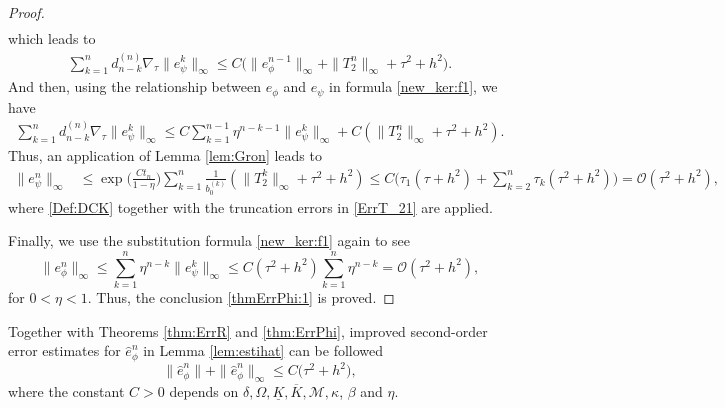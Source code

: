 \documentclass{m2an}
\newcommand{\mo}{\mathcal{O}}
\begin{document}
\begin{proof}
\begin{equation*}
\begin{aligned}
		\end{aligned}
	\end{equation*}
	which leads to
	\begin{equation*}
		\begin{aligned}
			\sum^n_{k=1} d_{n-k}^{(n)} \nabla_{\tau} \| e_{\psi}^k \|_{\infty} \leq C \big( \| e_\phi^{n-1} \|_{\infty} + \| T_2^n \|_{\infty} + \tau^2 + h^2 \big).
		\end{aligned}
	\end{equation*}
	And then, using the relationship between $e_\phi$ and $e_\psi$ in formula \eqref{new_ker:f1},  we have
	\begin{equation*}\label{ErrPhi_3}
		\begin{aligned}
			\sum^n_{k=1} d_{n-k}^{(n)} \nabla_{\tau} \| e_{\psi}^k \|_{\infty} \leq C \sum^{n-1}_{k=1} \eta^{n-k-1} \| e_\psi^{k} \|_{\infty} + C ( \| T_2^n \|_{\infty} + \tau^2 + h^2 ).
		\end{aligned}
	\end{equation*}
	Thus, an application of  Lemma \ref{lem:Gron} leads to
	\begin{equation*}
		\begin{aligned}
			\| e_{\psi}^n \|_{\infty} & \leq  \exp \Big(\frac{C t_n}{1-\eta}\Big) \sum_{k=1}^n \frac{1}{b_0^{(k)}} \left( \| T_2^k \|_{\infty} + \tau^2 + h^2  \right)  \leq C \Big( \tau_1 ( \tau + h^2  ) + \sum_{k=2}^n \tau_k ( \tau^2 + h^2  ) \Big) =\mo ( \tau^2 + h^2  ) ,  
		\end{aligned}
	\end{equation*}
	where \eqref{Def:DCK} together with the truncation errors in \eqref{ErrT_21}  are applied.
	
	Finally, we use the substitution formula \eqref{new_ker:f1} again to see
	\begin{equation*}\label{ErrPhi_4}
		\| e_{\phi}^n \|_{\infty} \leq \sum_{k=1}^{n} \eta^{n-k} \| e_\psi^k \|_{\infty} \leq C  ( \tau^2 + h^2  ) \sum^{ n }_{k=1} \eta^{n-k} =\mo( \tau^2 + h^2  ),
	\end{equation*}
	for $ 0 < \eta < 1 $. Thus, the conclusion \eqref{thmErrPhi:1} is proved.
\end{proof}

\begin{rmrk} 
	Together with Theorems \ref{thm:ErrR} and \ref{thm:ErrPhi}, improved second-order error estimates for $ \hat{e}_{\phi}^{n} $ in Lemma \ref{lem:estihat} can be followed
	\begin{equation*}
		\| \hat{e}_{\phi}^{n} \| + \| \hat{e}_{\phi}^{n} \|_{\infty} \leq C \big(  \tau^2 + h^2  \big),
	\end{equation*}
	where the constant $ C > 0 $ depends on $\delta, \Omega, \underline{K}, \overline{K}, \mathcal{M}, \kappa$, $ \beta $ and $\eta$.
\end{rmrk}
\end{document}
